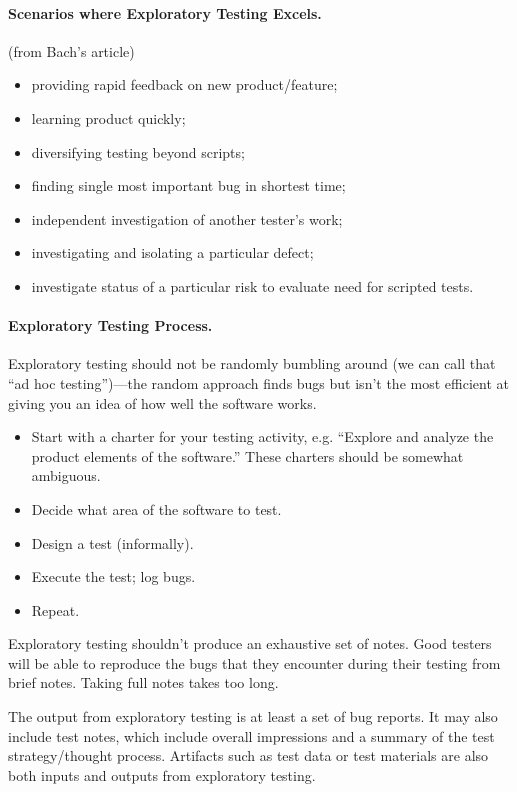 \documentclass[11pt]{article}
\begin{document}
\paragraph{Scenarios where Exploratory Testing Excels.} (from Bach's article)
\begin{itemize}[noitemsep]
\item providing rapid feedback on new product/feature;
\item learning product quickly;
\item diversifying testing beyond scripts;
\item finding single most important bug in shortest time;
\item independent investigation of another tester's work;
\item investigating and isolating a particular defect;
\item investigate status of a particular risk to evaluate need for scripted tests.
\end{itemize}

\paragraph{Exploratory Testing Process.} Exploratory testing should not be
randomly bumbling around (we can call that ``ad hoc testing'')---the random
approach finds bugs but isn't the most efficient at giving you an idea of how well
the software works.

\begin{itemize}[noitemsep]
\item Start with a charter for your testing activity, e.g. ``Explore and analyze the product elements of the software.'' 
These charters should be somewhat ambiguous.
\item Decide what area of the software to test.
\item Design a test (informally).
\item Execute the test; log bugs.
\item Repeat.
\end{itemize}
Exploratory testing shouldn't produce an exhaustive set of notes. Good testers will
be able to reproduce the bugs that they encounter during their testing from brief notes.
Taking full notes takes too long.

The output from exploratory testing is at least a set of bug
reports. It may also include test notes, which include overall
impressions and a summary of the test strategy/thought
process. Artifacts such as test data or test materials are also both
inputs and outputs from exploratory testing.
\end{document}
